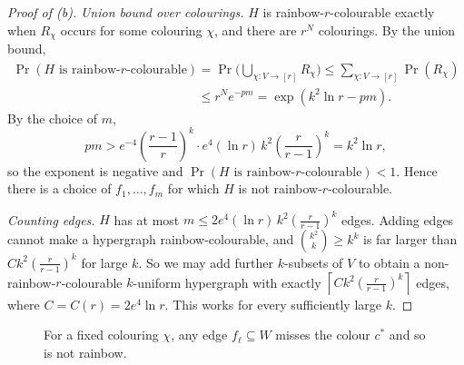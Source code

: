 \documentclass[a4paper,12pt]{article}
\begin{document}
\begin{proof}[Proof of (b)]
	\emph{Union bound over colourings.} $H$ is rainbow-$r$-colourable exactly when $R_\chi$ occurs for some colouring $\chi$, and there are $r^N$ colourings. By the union bound,
	\begin{align*}
		\Pr(H \text{ is rainbow-}r\text{-colourable}) &= \Pr\Big( \bigcup_{\chi : V \to [r]} R_\chi \Big) \le \sum_{\chi : V \to [r]} \Pr(R_\chi) \\
		&\le r^{N} e^{-pm} = \exp\left( k^2 \ln r - pm \right).
	\end{align*}
	By the choice of $m$,
	\[
		pm > e^{-4} \left( \frac{r-1}{r} \right)^k \cdot e^4 (\ln r)\, k^2 \left( \frac{r}{r-1} \right)^k = k^2 \ln r,
	\]
	so the exponent is negative and $\Pr(H \text{ is rainbow-}r\text{-colourable}) < 1$. Hence there is a choice of $f_1, \dots, f_m$ for which $H$ is not rainbow-$r$-colourable.

	\emph{Counting edges.} $H$ has at most $m \le 2 e^4 (\ln r)\, k^2 \left( \frac{r}{r-1} \right)^k$ edges. Adding edges cannot make a hypergraph rainbow-colourable, and $\binom{k^2}{k} \ge k^k$ is far larger than $C k^2 \left( \frac{r}{r-1} \right)^k$ for large $k$. So we may add further $k$-subsets of $V$ to obtain a non-rainbow-$r$-colourable $k$-uniform hypergraph with exactly $\left\lceil C k^2 \left( \frac{r}{r-1} \right)^k \right\rceil$ edges, where $C = C(r) = 2 e^4 \ln r$. This works for every sufficiently large $k$.
\end{proof}

\begin{figure}[ht]
\centering
{}
\caption{For a fixed colouring $\chi$, any edge $f_\ell \subseteq W$ misses the colour $c^*$ and so is not rainbow.}
\label{fig:ex5}
\end{figure}
\end{document}
